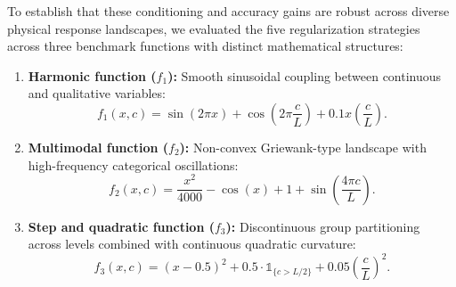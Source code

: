 \documentclass[default,sn-mathphys,Numbered]{sn-jnl}
\theoremstyle{thmstyleone}
\theoremstyle{thmstylethree}
\theoremstyle{thmstyletwo}
\begin{document}
To establish that these conditioning and accuracy gains are robust across diverse physical response landscapes, we evaluated the five regularization strategies across three benchmark functions with distinct mathematical structures:
\begin{enumerate}
    \item \textbf{Harmonic function ($f_1$):} Smooth sinusoidal coupling between continuous and qualitative variables:
    \begin{equation}
    f_1(x, c) = \sin(2\pi x) + \cos\left(2\pi \frac{c}{L}\right) + 0.1 x \left(\frac{c}{L}\right).
    \end{equation}
    \item \textbf{Multimodal function ($f_2$):} Non-convex Griewank-type landscape with high-frequency categorical oscillations:
    \begin{equation}
    f_2(x, c) = \frac{x^2}{4000} - \cos(x) + 1 + \sin\left(\frac{4\pi c}{L}\right).
    \end{equation}
    \item \textbf{Step and quadratic function ($f_3$):} Discontinuous group partitioning across levels combined with continuous quadratic curvature:
    \begin{equation}
    f_3(x, c) = (x - 0.5)^2 + 0.5 \cdot \mathds{1}_{\{c > L/2\}} + 0.05 \left(\frac{c}{L}\right)^2.
    \end{equation}
\end{enumerate}
\end{document}
